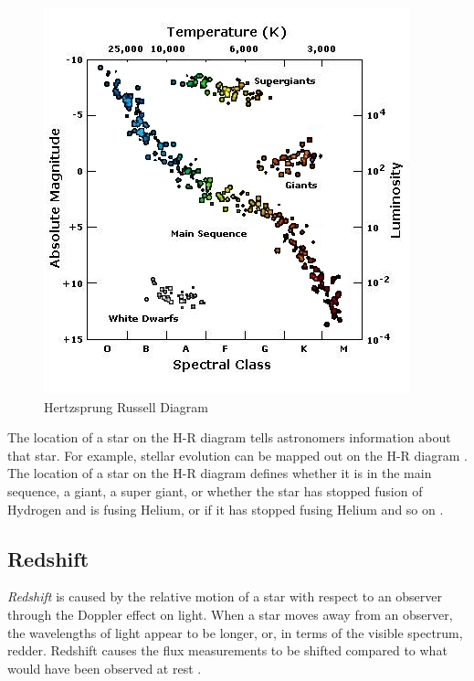 \documentclass[conference]{IEEEtran}
\begin{document}
        \begin{figure}
            \centering
            \includegraphics[scale = .37]{HR.jpg} %
            \caption{Hertzsprung Russell Diagram \cite{hr}}
            \label{fig:HR}
        \end{figure}

        The location of a star on the H-R diagram tells astronomers information about that star. For example, stellar evolution can be mapped out on the H-R diagram \cite{Carroll}. The location of a star on the H-R diagram defines whether it is in the main sequence, a giant, a super giant, or whether the star has stopped fusion of Hydrogen and is fusing Helium, or if it has stopped fusing Helium and so on \cite{Carroll}.

	\subsection{Redshift}\label{sec:redshift}

	\textit{Redshift} is caused by the relative motion of a star with respect to an observer through the Doppler effect on light. When a star moves away from an observer, the wavelengths of light appear to be longer, or, in terms of the visible spectrum, redder. Redshift causes the flux measurements to be shifted compared to what would have been observed at rest \cite{Carroll, Chromey}.
\end{document}
